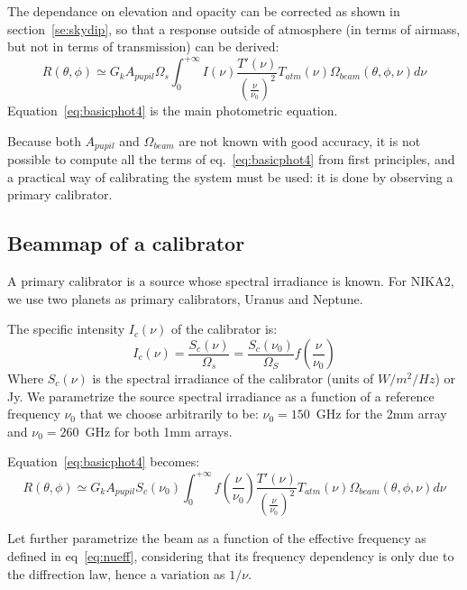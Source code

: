 The dependance on elevation and opacity can be corrected as shown in
section~\ref{se:skydip}, so that a response outside of atmosphere (in
terms of airmass, but not in terms of transmission) can be derived:
\begin{equation}
R(\theta, \phi) \simeq G_{k}  A_{pupil}\Omega_{s} \int_{0}^{+\infty} I(\nu)
\frac{T'(\nu)}{\left(\frac{\nu}{\nu_{0}}\right)^{2}} T_{atm}(\nu) \Omega_{beam} (\theta, \phi, \nu)  d\nu 
\label{eq:basicphot4}
\end{equation}
Equation~\ref{eq:basicphot4} is the main photometric equation.

Because both $A_{pupil}$ and $ \Omega_{beam} $ are not known with good
accuracy, it is not possible to compute all the terms of
eq.~\ref{eq:basicphot4} from first principles, and a practical way of
calibrating the system must be used: it is done by observing a primary
calibrator.

\subsection{Beammap of a calibrator}

A primary calibrator is a source whose spectral irradiance is
known. For NIKA2, we use two planets as primary calibrators, Uranus
and Neptune.



The specific intensity $I_{c}(\nu)$ of the
calibrator is:
\begin{equation}
I_{c}(\nu) =  \frac{S_{c}(\nu)}{\Omega_{s}} =\frac{ S_{c}
(\nu_{0})}{\Omega_{S}} f(\frac{\nu}{\nu_{0}})  
\end{equation}
Where $S_{c}(\nu)$ is the spectral irradiance of the calibrator (units
of $W/m^{2}/Hz$) or Jy. We parametrize the source spectral irradiance
as a function of a reference frequency $\nu_{0}$ that we choose
arbitrarily to be: $\nu_{0} = 150$~GHz for the 2mm array and $\nu_{0}
= 260$~GHz for both 1mm arrays. 


Equation~\ref{eq:basicphot4} becomes:
\begin{equation}
R(\theta, \phi) \simeq G_{k}  A_{pupil}  S_{c} (\nu_{0}) \int_{0}^{+\infty} f(\frac{\nu}{\nu_{0}})  
\frac{T'(\nu)}{\left(\frac{\nu}{\nu_{0}}\right)^{2}} T_{atm}(\nu) \Omega_{beam} (\theta, \phi, \nu)  d\nu 
\label{eq:basicphot5}
\end{equation}

Let further parametrize the beam as a function
of the effective frequency as defined in eq~\ref{eq:nueff},
considering that its frequency dependency is only due to the diffrection law,
hence a variation as $1/\nu$.

